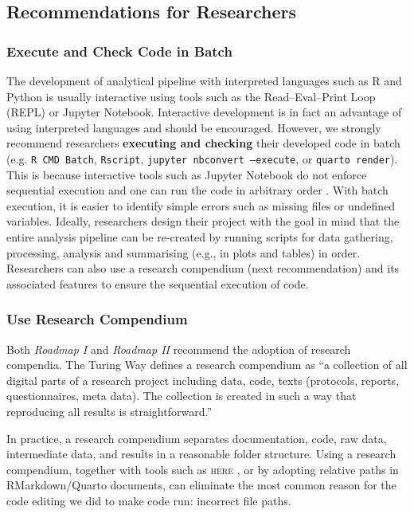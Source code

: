 \subsection{Recommendations for Researchers}
\label{subsec:recsres}

\subsubsection{Execute and Check Code in Batch}

The development of analytical pipeline with interpreted languages such as R and Python is usually interactive using tools such as the Read–Eval–Print Loop (REPL) or Jupyter Notebook. Interactive development is in fact an advantage of using interpreted languages and should be encouraged. However, we strongly recommend researchers \textbf{executing and checking} their developed code in batch (e.g. \texttt{R CMD Batch}, \texttt{Rscript}, \texttt{jupyter nbconvert --execute}, or \texttt{quarto render}). This is because interactive tools such as Jupyter Notebook do not enforce sequential execution and one can run the code in arbitrary order \parencite[]{samuel2023computational}. With batch execution, it is easier to identify simple errors such as missing files or undefined variables. Ideally, researchers design their project with the goal in mind that the entire analysis pipeline can be re-created by running scripts for data gathering, processing, analysis and summarising (e.g., in plots and tables) in order. Researchers can also use a research compendium (next recommendation) and its associated features to ensure the sequential execution of code.

\subsubsection{Use Research Compendium}

Both \textit{Roadmap I} and \textit{Roadmap II} recommend the adoption of research compendia. The Turing Way \parencite[]{The_Turing_Way:2022} defines a research compendium as ``a collection of all digital parts of a research project including data, code, texts (protocols, reports, questionnaires, meta data). The collection is created in such a way that reproducing all results is straightforward.''

In practice, a research compendium separates documentation, code, raw data, intermediate data, and results in a reasonable folder structure. Using a research compendium, together with tools such as \textsc{here} \parencite{hererpkg}, or by adopting relative paths in RMarkdown/Quarto documents, can eliminate the most common reason for the code editing we did to make code run: incorrect file paths.

